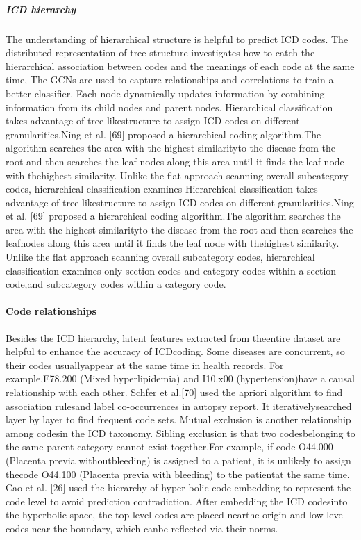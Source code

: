 \subparagraph{ICD hierarchy}
The  understanding  of  hierarchical  structure  is  helpful  to predict  ICD  codes.  The  distributed  representation  of  tree structure  investigates  how  to  catch  the  hierarchical  association  between  codes  and  the  meanings  of  each  code  at the same time, The GCNs  are  used  to  capture  relationships  and  correlations to  train  a  better  classifier.  Each  node  dynamically  updates information by combining information from its child nodes and  parent  nodes. 
Hierarchical  classification  takes  advantage  of  tree-likestructure  to  assign  ICD  codes  on  different  granularities.Ning  et  al.  [69]  proposed  a  hierarchical  coding  algorithm.The algorithm searches the area with the highest similarityto  the  disease  from  the  root  and  then  searches  the  leaf nodes  along  this  area  until  it  finds  the  leaf  node  with  thehighest  similarity.  Unlike  the  flat  approach  scanning  overall  subcategory  codes,  hierarchical  classification  examines Hierarchical  classification  takes  advantage  of  tree-likestructure  to  assign  ICD  codes  on  different  granularities.Ning  et  al.  [69]  proposed  a  hierarchical  coding  algorithm.The algorithm searches the area with the highest similarityto  the  disease  from  the  root  and  then  searches  the  leafnodes  along  this  area  until  it  finds  the  leaf  node  with  thehighest  similarity.  Unlike  the  flat  approach  scanning  overall  subcategory  codes,  hierarchical  classification  examines only section codes and category codes within a section code,and  subcategory  codes  within  a  category  code.  

\paragraph{Code relationships}
Besides the ICD hierarchy, latent features extracted from theentire  dataset  are  helpful  to  enhance  the  accuracy  of  ICDcoding. Some diseases are concurrent, so their codes usuallyappear  at  the  same  time  in  health  records.  For  example,E78.200 (Mixed hyperlipidemia) and I10.x00 (hypertension)have  a  causal  relationship  with  each  other.  Schfer  et  al.[70]  used  the  apriori  algorithm  to  find  association  rulesand  label  co-occurrences  in  autopsy  report.  It  iterativelysearched  layer  by  layer  to  find  frequent  code  sets. Mutual  exclusion  is  another  relationship  among  codesin  the  ICD  taxonomy.  Sibling  exclusion  is  that  two  codesbelonging to the same parent category cannot exist together.For   example,   if   code   O44.000   (Placenta   previa   withoutbleeding) is assigned to a patient, it is unlikely to assign thecode O44.100 (Placenta previa with bleeding)  to the patientat the same time.
Cao et al. [26] used the hierarchy of hyper-bolic code embedding to represent the code level to avoid
prediction  contradiction.  After  embedding  the  ICD  codesinto the hyperbolic space, the top-level codes are placed nearthe origin and low-level codes near the boundary, which canbe reflected via their norms.

